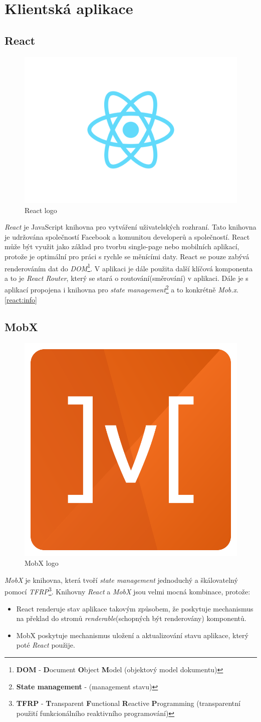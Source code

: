\newpage
\section{Klientská aplikace}
\label{pouzite:frontend}

\subsection*{React}
\label{frontend:react}

\begin{figure}[hbt]
  \centering
  \includegraphics[width=.3 \linewidth]{obrazky-figures/react.png}
  \caption{React logo}
\end{figure}

\emph{React} je JavaScript knihovna pro vytváření uživatelských rozhraní.
Tato knihovna je udržována společností Facebook a komunitou developerů a společností.
React může být využit jako základ pro tvorbu single-page nebo mobilních aplikací, protože je optimální pro práci s rychle se měnícími daty.
React se pouze zabývá renderováním dat do \emph{DOM}\footnote{\textbf{DOM} - \textbf{D}ocument \textbf{O}bject \textbf{M}odel (objektový model dokumentu)}.
V aplikaci je dále použita další klíčová komponenta a to je \emph{React Router}, který se stará o routování(směrování) v aplikaci.
Dále je s aplikací propojena i knihovna pro \emph{state management}\footnote{\textbf{State management} - (management stavu)} a to konkrétně \emph{Mob.x}.\ref{react:info}

\subsection*{MobX}
\label{frontend:mobx}
\begin{figure}[hbt]
  \centering
  \includegraphics[width=.1 \linewidth]{obrazky-figures/mobx.png}
  \caption{MobX logo}
\end{figure}

\emph{MobX} je knihovna, která tvoří \emph{state management} jednoduchý a škálovatelný pomocí \emph{TFRP}\footnote{\textbf{TFRP} - \textbf{T}ransparent \textbf{F}unctional \textbf{R}eactive \textbf{P}rogramming (transparentní použití funkcionálního reaktivního programování)}.
Knihovny \emph{React} a \emph{MobX} jsou velmi mocná kombinace, protože:
\begin{itemize}
  \item React renderuje stav aplikace takovým způsobem, že poskytuje mechanismus na překlad do stromů \emph{renderable}(schopných být renderovány) komponentů.
  \item MobX poskytuje mechanismus uložení a aktualizování stavu aplikace, který poté \emph{React} použije.
\end{itemize}

